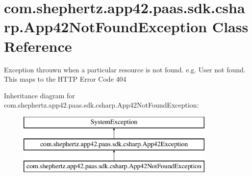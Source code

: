 \hypertarget{classcom_1_1shephertz_1_1app42_1_1paas_1_1sdk_1_1csharp_1_1_app42_not_found_exception}{\section{com.\+shephertz.\+app42.\+paas.\+sdk.\+csharp.\+App42\+Not\+Found\+Exception Class Reference}
\label{classcom_1_1shephertz_1_1app42_1_1paas_1_1sdk_1_1csharp_1_1_app42_not_found_exception}
}


Exception throuwn when a particular resource is not found. e.\+g. User not found. This maps to the H\+T\+T\+P Error Code 404  


Inheritance diagram for com.\+shephertz.\+app42.\+paas.\+sdk.\+csharp.\+App42\+Not\+Found\+Exception\+:\begin{figure}[H]
\begin{center}
\leavevmode
\includegraphics[height=3.000000cm]{classcom_1_1shephertz_1_1app42_1_1paas_1_1sdk_1_1csharp_1_1_app42_not_found_exception}
\end{center}
\end{figure}
